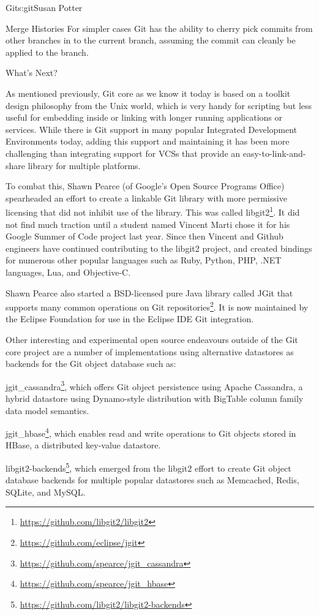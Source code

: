 \begin{aosachapter}{Git}{s:git}{Susan Potter}
\begin{aosasect1}{Merge Histories}
For simpler cases Git has the ability to cherry pick commits from
other branches in to the current branch, assuming the commit can cleanly
be applied to the branch.

\end{aosasect1}

\begin{aosasect1}{What's Next?}

As mentioned previously, Git core as we know it today is based on a toolkit
design philosophy from the Unix world, which is very handy for scripting
but less useful for embedding inside or linking with longer running
applications or services. While there is Git support in many popular
Integrated Development Environments today, adding this support and
maintaining it has been more challenging than integrating support for VCSs
that provide an easy-to-link-and-share library for multiple platforms.

To combat this, Shawn Pearce (of Google's Open Source Programs Office)
spearheaded an effort to create a linkable Git library with more permissive
licensing that did not inhibit use of the library. This was called 
libgit2\footnote{\url{https://github.com/libgit2/libgit2}}.
It did not find much traction until a student named Vincent Marti chose it
for his Google Summer of Code project last year. Since then Vincent and
Github engineers have continued contributing to the libgit2 project, and
created bindings for numerous other popular languages such as Ruby, Python,
PHP, .NET languages, Lua, and Objective-C.

Shawn Pearce also started a BSD-licensed pure Java library called JGit that
supports many common operations on Git 
repositories\footnote{\url{https://github.com/eclipse/jgit}}. It is now maintained by
the Eclipse Foundation for use in the Eclipse IDE Git integration.

Other interesting and experimental open source endeavours outside of the
Git core project are a number of implementations using alternative datastores
as backends for the Git object database such as:

 \begin{aosaitemize}
  \item jgit\_cassandra\footnote{\url{https://github.com/spearce/jgit\_cassandra}},
    which offers Git object persistence using Apache Cassandra, a hybrid datastore
    using Dynamo-style distribution with BigTable column family data model
    semantics.
  \item jgit\_hbase\footnote{\url{https://github.com/spearce/jgit\_hbase}},
    which enables read and write operations to Git objects stored in HBase, a
    distributed key-value datastore.
  \item libgit2-backends\footnote{\url{https://github.com/libgit2/libgit2-backends}},
    which emerged from the libgit2 effort to create Git object database
    backends for multiple popular datastores such as Memcached, Redis,
    SQLite, and MySQL.
\end{aosaitemize}


\end{aosasect1}
\end{aosachapter}
